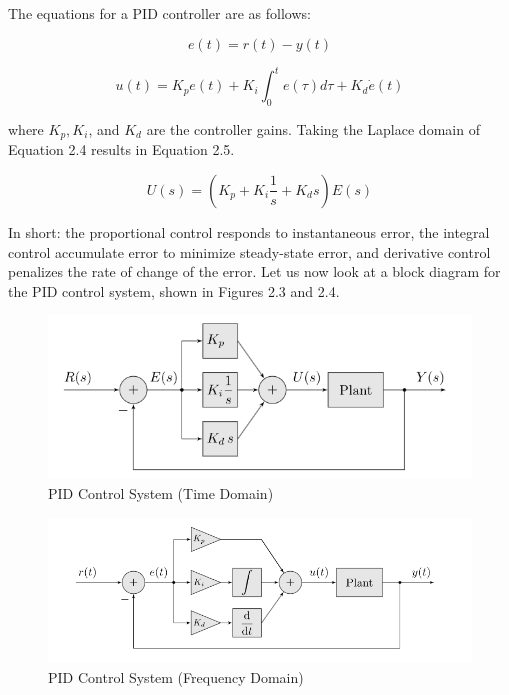 \documentclass{article}
\begin{document}
The equations for a PID controller are as follows:

\begin{equation}
    e(t)=r(t)-y(t)
\end{equation}

\begin{equation}
u(t)=K_pe(t)+K_i\int_0^{t}e(\tau)d\tau+K_d\dot{e}(t)
\end{equation}

 where $K_p,  K_i$, and $K_d$ are the controller gains. Taking the Laplace domain of Equation 2.4 results in Equation 2.5.

\begin{equation}
    U(s)=(K_p+K_i\frac{1}{s}+K_ds)E(s)
\end{equation}

In short: the proportional control responds to instantaneous error, the integral control accumulate error to minimize steady-state error, and derivative control penalizes the rate of change of the error. Let us now look at a block diagram for the PID control system, shown in Figures 2.3 and 2.4.

\begin{figure}[h]
    \centering
    \includegraphics[width=0.8\linewidth]{figures/PID_freq.png}
    \caption{PID Control System (Time Domain)}
    \label{fig:enter-label}
\end{figure}

\begin{figure}[h]
    \centering
    \includegraphics[width=0.8\linewidth]{figures/PID_time.png}
    \caption{PID Control System (Frequency Domain)}
    \label{fig:enter-label}
\end{figure}
\end{document}
